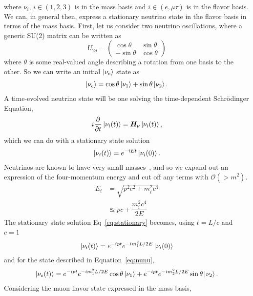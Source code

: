 \documentclass[main.tex]{subfiles}
\begin{document}
where $\nu_{i}$, $i\in\left(1,2,3\right)$ is in the mass basis and $i\in\left(e,\mu\tau\right)$ is in the flavor basis. 
We can, in general then, express a stationary neutrino state in the flavor basis in terms of the mass basis. 
First, let us consider two neutrino oscillations, where a generic SU(2) matrix can be written as 
\begin{equation}
    U_{2d}=\left(\begin{array}{cc} \cos\theta & \sin\theta \\ -\sin\theta & \cos\theta \end{array}\right)
\end{equation}
where $\theta$ is some real-valued angle describing a rotation from one basis to the other. So we can write an initial $\left| \nu_{e} \right >$ state as 
\begin{equation}\label{eq:nunu}
    \left| \nu_{e} \right > = \cos\theta \left| \nu_{1} \right > + \sin\theta \left| \nu_{2} \right >.
\end{equation}
A time-evolved neutrino state will be one solving the time-dependent Schr\"odinger Equation,
\begin{equation}
    i\dfrac{\partial}{\partial t} \left| \nu_{i} (t) \right > = \bm{H}_{\nu}\left| \nu_{i}(t) \right >,
\end{equation}
which we can do with a stationary state solution
\begin{equation}\label{eq:stationary}
    \left| \nu_{i} (t) \right >  =  e^{-iEt} \left| \nu_{i} (0) \right >.
\end{equation}
Neutrinos are known to have very small masses~\cite{KATRIN:2021uub}, and so we expand out an expression of the four-momentum energy and cut off any terms with $\mathcal{O}(>m^{2})$. 
\begin{align}
    E_{i} &= \sqrt{p^{2}c^{2} + m_{i}^{2}c^{4}} \\
    &\approxeq pc + \dfrac{m_{i}^{2}c^{4}}{2E}
\end{align}
The stationary state solution Eq~\eqref{eq:stationary} becomes, using $t=L/c$ and $c=1$ 
\begin{equation}
    \left| \nu_{i} (t) \right >  =  e^{-ipt}e^{ -im_{i}^{2}L/2E}\left| \nu_{i} (0) \right >
\end{equation}
and for the state described in Equation~\eqref{eq:nunu},
\begin{equation}
    \left| \nu_{e}(t) \right > = e^{-ipt}e^{ -im_{1}^{2}L/2E} \cos\theta \left| \nu_{1} \right >  + e^{-ipt}e^{ -im_{2}^{2}L/2E} \sin\theta \left| \nu_{2} \right >.
\end{equation}
Considering the muon flavor state expressed in the mass basis,
\end{document}
